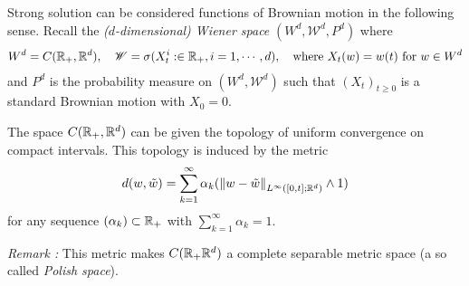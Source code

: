 \documentclass[12pt,a4paper]{article}
\begin{document}
Strong solution can be considered functions of Brownian motion in the following sense. Recall the \emph{($d$-dimensional) Wiener space} $(W^d, \mathscr{W}^d, P^d)$ where
\begin{align*}
W^d = C(\mathbb{R}_+, \mathbb{R}^d), \quad \mathscr{W} = \sigma(X_t^i : \in \mathbb{R}_+, i=1, \cdots, d), \quad \text{where }X_t(w) = w(t) \text{ for } w\in W^d
\end{align*}
and $P^d$ is the probability measure on $(W^d, \mathscr{W}^d)$ such that $(X_t)_{t\geq 0}$ is a standard Brownian motion with $X_0 =0$.

\quad The space $C(\mathbb{R}_+, \mathbb{R}^d)$ can be given the topology of uniform convergence on compact intervals. This topology is induced by the metric
\begin{align*}
d(w, \tilde{w}) = \sum_{k=1}^{\infty} \alpha_k (\snorms{w - \tilde{w}}{L^{\infty}([0, t];\reals^d)} \wedge 1)
\end{align*}
for any sequence $(\alpha_k) \subset \mathbb{R}_+$ with $\sum_{k=1}^{\infty} \alpha_k =1$. 
\s

\emph{Remark :} This metric makes $C(\mathbb{R}_+ \mathbb{R}^d)$ a complete separable metric space (a so called \emph{Polish space}).
\s
\end{document}
